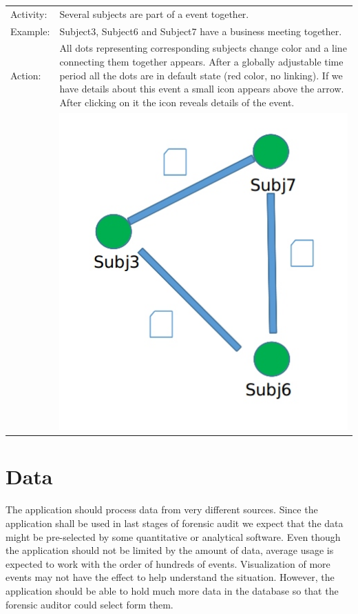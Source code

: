 \begin{tabularx}{\textwidth}{l X}
Activity: & Several subjects are part of a event together. \\
Example: & Subject3, Subject6 and Subject7 have a business meeting together.\\
Action: & All dots representing corresponding subjects change color and a line connecting them together appears. After a globally adjustable time period all the dots are in default state (red color, no linking). If we have details about this event a small icon appears above the arrow. After clicking on it the icon reveals details of the event.\\
& \includegraphics[scale=0.3]{./img/visualization/subjects_together.png}\\

\end{tabularx}



\section{Data}
The application should process data from very different sources. Since the application shall be used in last stages of forensic audit we expect that the data might be pre-selected by some quantitative or analytical software. Even though the application should not be limited by the amount of data, average usage is expected to work with the order of hundreds of events. Visualization of more events may not have the effect to help understand the situation. However, the application should be able to hold much more data in the database so that the forensic auditor could select form them.

